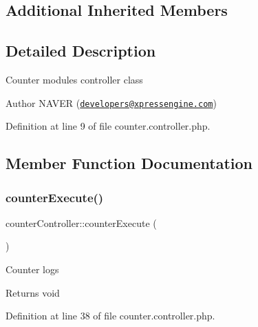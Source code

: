 \subsection*{Additional Inherited Members}


\subsection{Detailed Description}
Counter module\textquotesingle{}s controller class

\begin{DoxyAuthor}{Author}
N\+A\+V\+ER (\href{mailto:developers@xpressengine.com}{\tt developers@xpressengine.\+com}) 
\end{DoxyAuthor}


Definition at line 9 of file counter.\+controller.\+php.



\subsection{Member Function Documentation}
\mbox{\label{classcounterController_ad088e584257571fffd0ea9153c676a7f}} 
\subsubsection{\texorpdfstring{counter\+Execute()}{counterExecute()}}
{\footnotesize\ttfamily counter\+Controller\+::counter\+Execute (\begin{DoxyParamCaption}{ }\end{DoxyParamCaption})}

Counter logs

\begin{DoxyReturn}{Returns}
void 
\end{DoxyReturn}


Definition at line 38 of file counter.\+controller.\+php.

\mbox{\label{classcounterController_a27eebacfe75ed149166d010af2320faf}} 
